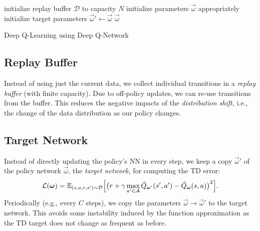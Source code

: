 		\begin{algorithm}  \DontPrintSemicolon
			initialize replay buffer \(\mathcal{D}\) to capacity \(N\) \;
			initialize parameters \(\vec{\omega}\) appropriately \;
			initialize target parameters \( \vec{\omega}' \gets \vec{\omega} \) \;
			\Return \(\vec{\omega}\)
			\caption{Deep Q-Learning using Deep Q-Network}
			\label{alg:deepQLearning}
		\end{algorithm}

		\subsection{Replay Buffer}
			Instead of using just the current data, we collect individual transitions in a \emph{replay buffer} (with finite capacity). Due to off-policy updates, we can re-use transitions from the buffer. This reduces the negative impacts of the \emph{distribution shift,} i.e., the change of the data distribution as our policy changes.

		\subsection{Target Network}
			Instead of directly updating the policy's \ac{NN} in every step, we keep a copy \(\vec{\omega}'\) of the policy network \(\vec{\omega}\), the \emph{target network,} for computing the \ac{TD} error:
			\begin{equation}
				\mathcal{L}(\bm{\omega}) = \mathbb{E}_{(s, a, r, s') \sim \mathcal{D}}\Bigl[ \bigl( r + \gamma \max_{a' \in \mathcal{A}} \hat{Q}_{\bm{\omega}'}(s', a') - \hat{Q}_{\bm{\omega}}(s, a) \bigr)^2 \Bigr].
			\end{equation}
			Periodically (e.g., every \(C\) steps), we copy the parameters \(\vec{\omega} \to \vec{\omega}'\) to the target network. This avoids some instability induced by the function approximation as the \ac{TD} target does not change as frequent as before.

